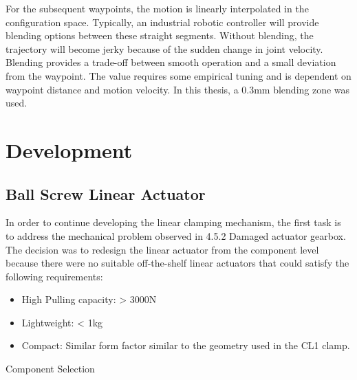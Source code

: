 For the subsequent waypoints, the motion is linearly interpolated in the configuration space. Typically, an industrial robotic controller will provide blending options between these straight segments. Without blending, the trajectory will become 	jerky because of the sudden change in joint velocity. Blending provides a trade-off between smooth operation and a small deviation from the waypoint. The value requires some empirical tuning and is dependent on waypoint distance and motion velocity. In this thesis, a 0.3mm blending zone was used. 

\section{Development}
\label{section:exploration-2-development}

\subsection{Ball Screw Linear Actuator}
\label{subsection:exploration-2-ball-screw-linear-actuator}

In order to continue developing the linear clamping mechanism, the first task is to address the mechanical problem observed in 4.5.2 Damaged actuator gearbox. The decision was to redesign the linear actuator from the component level because there were no suitable off-the-shelf linear actuators that could satisfy the following requirements:
\begin{itemize}
    \item High Pulling capacity: > 3000N
    \item Lightweight: < 1kg
    \item Compact: Similar form factor similar to the geometry used in the CL1 clamp.
\end{itemize}

Component Selection

